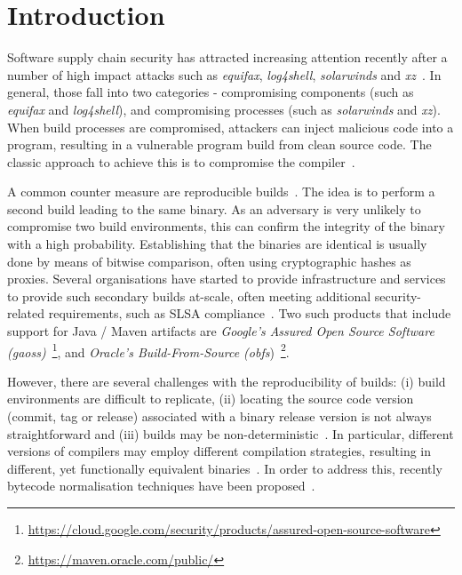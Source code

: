 \documentclass[conference]{IEEEtran}
\begin{document}
\section{Introduction}

Software supply chain security has attracted increasing attention recently after a number of high impact attacks such as \textit{equifax}, \textit{log4shell}, \textit{solarwinds} and \textit{xz}~\cite{ellison2010evaluating,martinez2021software,enck2022top,EO14028}. In general, those fall into two categories - compromising components (such as \textit{equifax} and \textit{log4shell}), and compromising processes (such as \textit{solarwinds} and \textit{xz}). When build processes are compromised, attackers can inject malicious code into a program, resulting in a vulnerable program build from clean source code. The classic approach to achieve this is to compromise the compiler~\cite{thompson1984reflections}. 

A common counter measure are reproducible builds~\cite{reproduciblebuild, lamb2021reproducible}. The idea is to perform a second build leading to the same binary. As an adversary is very unlikely to compromise two build environments, this can confirm the integrity of the binary with a high probability. Establishing that the binaries are identical is usually done by means of bitwise comparison, often using cryptographic hashes as proxies.
Several organisations have started to provide infrastructure and services to provide such secondary builds at-scale, often meeting additional security-related requirements, such as SLSA compliance~\cite{slsa}. Two such products that include support for Java / Maven artifacts are \textit{Google's Assured Open Source Software (gaoss)}~\footnote{\url{https://cloud.google.com/security/products/assured-open-source-software}}, and \textit{Oracle's Build-From-Source (obfs})~\footnote{\url{https://maven.oracle.com/public/}}.

However, there are several challenges with the reproducibility of builds: (i) build environments are difficult to replicate, (ii) locating the source code version (commit, tag or release) associated with a binary release version is not always straightforward and (iii) builds may be non-deterministic~\cite{xiong2022towards,hassanshahi2023macaron,bineqdataset,keshani2024aroma}. In particular, different versions of compilers may employ different compilation strategies, resulting in different, yet functionally equivalent binaries~\cite{xiong2022towards,bineqdataset,schott2024JNorm}.  
In order to address this, recently bytecode normalisation techniques have been proposed~\cite{xiong2022towards,dietrich2024levelsbinaryequivalencecomparison,schott2024JNorm}. 
\end{document}
